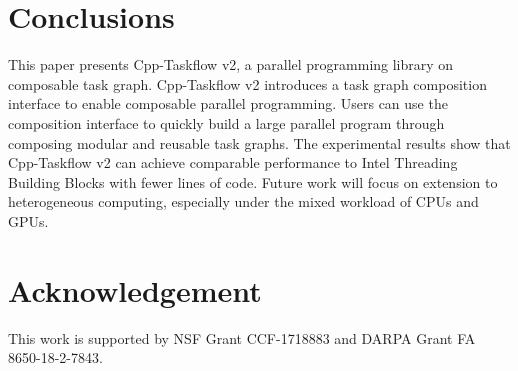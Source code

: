 \documentclass[conference]{IEEEtran}
\begin{document}
\section{Conclusions}
This paper presents Cpp-Taskflow v2, a parallel programming library on 
composable task graph.  Cpp-Taskflow v2 introduces a task graph composition
interface to enable composable parallel programming. 
Users can use the composition interface to quickly build a large parallel 
program through composing modular and reusable task graphs.
The experimental results show that Cpp-Taskflow v2 can achieve comparable
performance to Intel Threading Building Blocks with fewer lines of code.
Future work will focus on extension to heterogeneous computing,
especially under the mixed workload of CPUs and GPUs.

\section{Acknowledgement}
This work is supported by NSF Grant CCF-1718883 and DARPA Grant FA 8650-18-2-7843.




    

\end{document}
